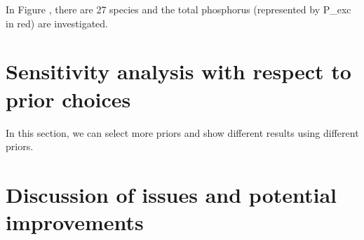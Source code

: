 \documentclass[a4paper]{artikel3}
\begin{document}






In Figure , there are 27 species and the total phosphorus (represented by P\_exc in red) are investigated.




\section{Sensitivity analysis with respect to prior choices}
In this section, we can select more priors and show different results using different priors. 

\section{Discussion of issues and potential improvements}
\end{document}
